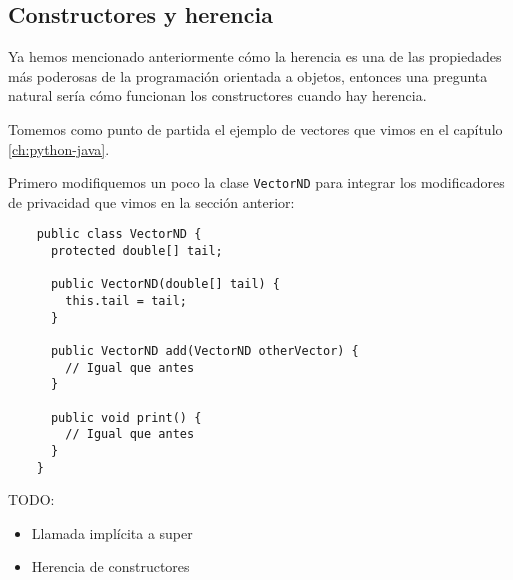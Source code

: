 \subsection{Constructores y herencia}
  Ya hemos mencionado anteriormente cómo la herencia es una de las propiedades más poderosas de la
  programación orientada a objetos, entonces una pregunta natural sería cómo funcionan los 
  constructores cuando hay herencia.

  Tomemos como punto de partida el ejemplo de vectores que vimos en el capítulo 
  \ref{ch:python-java}.

  Primero modifiquemos un poco la clase \texttt{VectorND} para integrar los modificadores de 
  privacidad que vimos en la sección anterior:

  \begin{verbatim}
    public class VectorND {
      protected double[] tail;

      public VectorND(double[] tail) {
        this.tail = tail;
      }

      public VectorND add(VectorND otherVector) {
        // Igual que antes
      }

      public void print() {
        // Igual que antes
      }
    }
  \end{verbatim}
  
  TODO:
  \begin{itemize}
    \item Llamada implícita a super
    \item Herencia de constructores
  \end{itemize}

